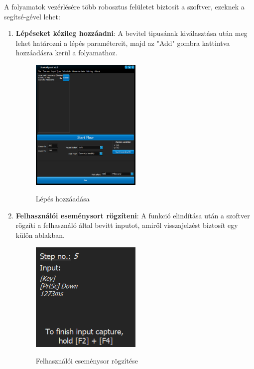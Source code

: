 A folyamatok vezérlésére több robosztus felületet biztosít a szoftver, ezeknek a segítsé\hyp{}gével lehet:
\begin{enumerate}
	\item{
		\textbf{Lépéseket kézileg hozzáadni}: A bevitel tipusának kiválasztása után meg lehet határozni a lépés paramétereit, majd az "Add" gombra kattintva hozzáadásra kerül a folyamathoz.
		\begin{figure}[h!]
			\begin{center}
				\caption{Lépés hozzáadása}
				\includegraphics[width=0.5\textwidth, keepaspectratio=true]{images/img_flow_add}\\
				\label{fig:example}
			\end{center}
		\end{figure}
	}
	\item{
		\textbf{Felhasználói eseménysort rögzíteni}: A funkció elindítása után a szoftver rögzíti a felhasználó által bevitt inputot, amiről visszajelzést biztosít egy külön ablakban.
		\begin{figure}[h!]
			\begin{center}
				\caption{Felhasználói eseménysor rögzítése}
				\includegraphics[width=0.5\textwidth, keepaspectratio=true]{images/img_flow_capture}\\

\end{center}
\end{figure}}
\end{enumerate}
